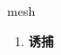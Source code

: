 
\begin{frame}
{\huge mesh}
\begin{center}
\begin{enumerate}\Large
  \item \textbf{诱捕}
\end{enumerate}
\end{center}
\end{frame}
